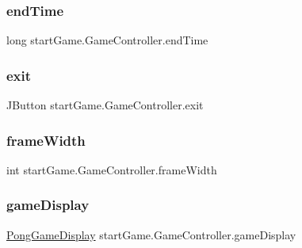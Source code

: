 \subsubsection{\texorpdfstring{end\+Time}{endTime}}
{\footnotesize\ttfamily long start\+Game.\+Game\+Controller.\+end\+Time\hspace{0.3cm}{\ttfamily [private]}}

\hypertarget{classstart_game_1_1_game_controller_a188e95237557694a640940111e794c5a}{}\label{classstart_game_1_1_game_controller_a188e95237557694a640940111e794c5a} 
\subsubsection{\texorpdfstring{exit}{exit}}
{\footnotesize\ttfamily J\+Button start\+Game.\+Game\+Controller.\+exit\hspace{0.3cm}{\ttfamily [private]}}

\hypertarget{classstart_game_1_1_game_controller_a1f16d94b3e5246eb723f9ca04aad4735}{}\label{classstart_game_1_1_game_controller_a1f16d94b3e5246eb723f9ca04aad4735} 
\subsubsection{\texorpdfstring{frame\+Width}{frameWidth}}
{\footnotesize\ttfamily int start\+Game.\+Game\+Controller.\+frame\+Width\hspace{0.3cm}{\ttfamily [private]}}

\hypertarget{classstart_game_1_1_game_controller_aca62497a42166cbb72f5eafbc270afde}{}\label{classstart_game_1_1_game_controller_aca62497a42166cbb72f5eafbc270afde} 
\subsubsection{\texorpdfstring{game\+Display}{gameDisplay}}
{\footnotesize\ttfamily \hyperlink{classview_1_1_pong_game_display}{Pong\+Game\+Display} start\+Game.\+Game\+Controller.\+game\+Display\hspace{0.3cm}{\ttfamily [private]}}

